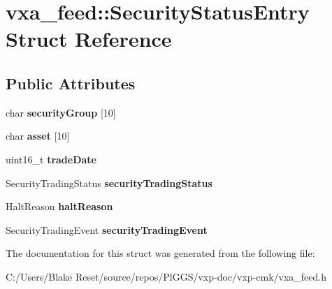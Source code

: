 \hypertarget{structvxa__feed_1_1_security_status_entry}{}\section{vxa\+\_\+feed\+::Security\+Status\+Entry Struct Reference}
\label{structvxa__feed_1_1_security_status_entry}
\subsection*{Public Attributes}
\begin{DoxyCompactItemize}
\item 
\mbox{\label{structvxa__feed_1_1_security_status_entry_aed2eedf66ae25f64dbd5cd8cb57c8021}} 
char {\bfseries security\+Group} \mbox{[}10\mbox{]}
\item 
\mbox{\label{structvxa__feed_1_1_security_status_entry_add492135c52ea0a107ab964aa64969e6}} 
char {\bfseries asset} \mbox{[}10\mbox{]}
\item 
\mbox{\label{structvxa__feed_1_1_security_status_entry_a941f45b2a25771f78504197ab7f711c2}} 
uint16\+\_\+t {\bfseries trade\+Date}
\item 
\mbox{\label{structvxa__feed_1_1_security_status_entry_ae0576863a39f9c158775fb8abfe0feec}} 
Security\+Trading\+Status {\bfseries security\+Trading\+Status}
\item 
\mbox{\label{structvxa__feed_1_1_security_status_entry_a199d8cd457f95f432f3d9fbfcc8fb5db}} 
Halt\+Reason {\bfseries halt\+Reason}
\item 
\mbox{\label{structvxa__feed_1_1_security_status_entry_a7a736ac713f8b548f4d7db42c434649d}} 
Security\+Trading\+Event {\bfseries security\+Trading\+Event}
\end{DoxyCompactItemize}


The documentation for this struct was generated from the following file\+:\begin{DoxyCompactItemize}
\item 
C\+:/\+Users/\+Blake Reset/source/repos/\+Pl\+G\+G\+S/vxp-\/doc/vxp-\/cmk/vxa\+\_\+feed.\+h\end{DoxyCompactItemize}
